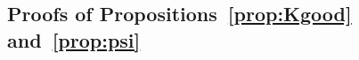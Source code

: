 \documentclass[
	fontsize=11pt, 
	twoside=false, 
	abstract=true, 
	a4paper,
]{scrartcl}
\newcommand{\eps}{\varepsilon}
\newcommand{\RR}{\mathbb{R}}
\newcommand{\dd}{\mathrm{d}}
\newcommand{\abs}[1]{\left\lvert#1\right\rvert}
\newcommand{\del}{\partial}
\begin{document}
\subsection{Proofs of Propositions~\ref{prop:Kgood} and~\ref{prop:psi}}\label{sec:proveK}

\end{document}
